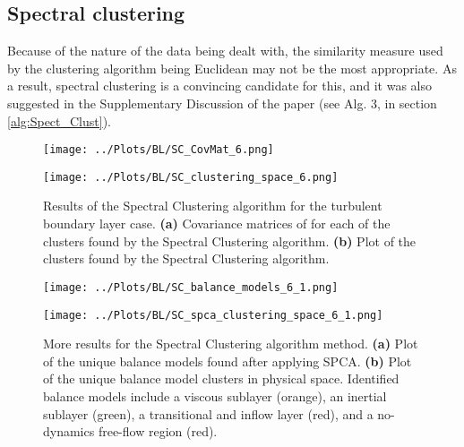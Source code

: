 \documentclass[12pt]{report} %
\begin{document}
\subsection{Spectral clustering}

Because of the nature of the data being dealt with, the similarity measure used by the clustering algorithm being Euclidean may not be the most appropriate\cite{luxburg2007tutorial}. As a result, spectral clustering is a convincing candidate for this, and it was also suggested in the Supplementary Discussion of the paper\cite[Supplementary Information]{callaham2021learning} (see Alg. 3, in section \ref{alg:Spect_Clust}).


\begin{figure}[htbp]
  \centering
  \begin{minipage}{0.9\textwidth}
    \centering
    \texttt{[image: ../Plots/BL/SC\_CovMat\_6.png]}
    \subcaption{}
  \end{minipage}

  \begin{minipage}{0.8\textwidth}
    \centering
    \texttt{[image: ../Plots/BL/SC\_clustering\_space\_6.png]}
    \subcaption{}
  \end{minipage}

  \caption{Results of the Spectral Clustering algorithm for the turbulent boundary layer case. \textbf{(a)} Covariance matrices of for each of the clusters found by the Spectral Clustering algorithm. \textbf{(b)} Plot of the clusters found by the Spectral Clustering algorithm.}
  \label{fig:SC_results_1}
\end{figure}

\begin{figure}[htbp]
  \centering
  \begin{minipage}[b]{0.6\textwidth}
      \centering
      \texttt{[image: ../Plots/BL/SC\_balance\_models\_6\_1.png]}
      \subcaption{}
  \end{minipage}

  \begin{minipage}[b]{0.6\textwidth}
      \centering
      \texttt{[image: ../Plots/BL/SC\_spca\_clustering\_space\_6\_1.png]}
      \subcaption{}
  \end{minipage}

  \caption{More results for the Spectral Clustering algorithm method. \textbf{(a)} Plot of the unique balance models found after applying SPCA. \textbf{(b)} Plot of the unique balance model clusters in physical space. Identified balance models include a viscous sublayer (orange), an inertial sublayer (green), a transitional and inflow layer (red), and a no-dynamics free-flow region (red).}
  \label{fig:SC_results_2}
\end{figure}
\end{document}
